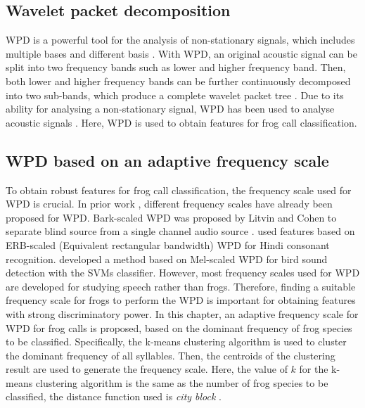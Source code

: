 \subsection{Wavelet packet decomposition}
WPD is a powerful tool for the analysis of non-stationary signals, which includes multiple bases and different basis \citep{selin2007wavelets}. With WPD, an original acoustic signal can be split into two frequency bands such as lower and higher frequency band. Then, both lower and higher frequency bands can be further continuously decomposed into two sub-bands, which produce a complete wavelet packet tree \citep{farooq2001mel}. Due to its ability for analysing a non-stationary signal, WPD has been used to analyse acoustic signals \citep{selin2007wavelets, ren2008perceptually}. Here, WPD is used to obtain features for frog call classification. 

\subsection{WPD based on an adaptive frequency scale}
To obtain robust features for frog call classification, the frequency scale used for WPD is crucial. In prior work \citep{barkWPDraey, Biswas20141111, Zhang2015108}, different frequency scales have already been proposed for WPD. Bark-scaled WPD was proposed by Litvin and Cohen to separate blind source from a single channel audio source \citep{barkWPDraey}. \cite{Biswas20141111} used features based on ERB-scaled (Equivalent rectangular bandwidth) WPD for Hindi consonant recognition.  \cite{Zhang2015108} developed a method based on Mel-scaled WPD for bird sound detection with the SVMs classifier. However, most frequency scales used for WPD are developed for studying speech rather than frogs. Therefore, finding a suitable frequency scale for frogs to perform the WPD is important for obtaining features with strong discriminatory power. In this chapter, an adaptive frequency scale for WPD for frog calls is proposed,  based on the dominant frequency of frog species to be classified. Specifically, the k-means clustering algorithm is used to cluster the dominant frequency of all syllables. Then, the centroids of the clustering result are used to generate the frequency scale. Here, the value of $k$ for the k-means clustering algorithm is the same as the number of frog species to be classified, the distance function used is \textit{city block} \citep{Melter1987235}. 


%
%




